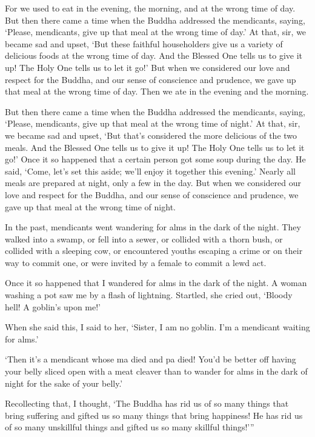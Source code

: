 \documentclass[12pt,openany]{book}%
\begin{document}
For we used to eat in the evening, the morning, and at the wrong time of day. But then there came a time when the Buddha addressed the mendicants, saying, ‘Please, mendicants, give up that meal at the wrong time of day.’ At that, sir, we became sad and upset, ‘But these faithful householders give us a variety of delicious foods at the wrong time of day. And the Blessed One tells us to give it up! The Holy One tells us to let it go!’ But when we considered our love and respect for the Buddha, and our sense of conscience and prudence, we gave up that meal at the wrong time of day. Then we ate in the evening and the morning. 

But then there came a time when the Buddha addressed the mendicants, saying, ‘Please, mendicants, give up that meal at the wrong time of night.’ At that, sir, we became sad and upset, ‘But that’s considered the more delicious of the two meals. And the Blessed One tells us to give it up! The Holy One tells us to let it go!’ Once it so happened that a certain person got some soup during the day. He said, ‘Come, let’s set this aside; we’ll enjoy it together this evening.’ Nearly all meals are prepared at night, only a few in the day. But when we considered our love and respect for the Buddha, and our sense of conscience and prudence, we gave up that meal at the wrong time of night. 

In the past, mendicants went wandering for alms in the dark of the night. They walked into a swamp, or fell into a sewer, or collided with a thorn bush, or collided with a sleeping cow, or encountered youths escaping a crime or on their way to commit one, or were invited by a female to commit a lewd act. 

Once it so happened that I wandered for alms in the dark of the night. A woman washing a pot saw me by a flash of lightning. Startled, she cried out, ‘Bloody hell! A goblin’s upon me!’ 

When she said this, I said to her, ‘Sister, I am no goblin. I’m a mendicant waiting for alms.’ 

‘Then it’s a mendicant whose ma died and pa died! You’d be better off having your belly sliced open with a meat cleaver than to wander for alms in the dark of night for the sake of your belly.’ 

Recollecting that, I thought, ‘The Buddha has rid us of so many things that bring suffering and gifted us so many things that bring happiness! He has rid us of so many unskillful things and gifted us so many skillful things!’” 
\end{document}
